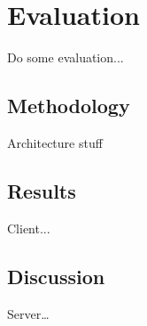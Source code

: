 \section{Evaluation}

Do some evaluation...


\subsection{Methodology}

Architecture stuff

\subsection{Results}

Client...

\subsection{Discussion}

Server\dots